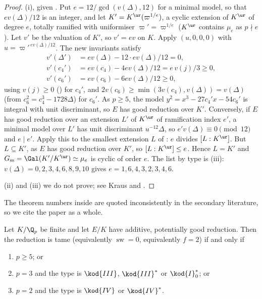 \begin{proof}
(i), given . Put $e=12/\gcd(v(\Delta),12)$ for a minimal model, so that $ev(\Delta)/12$ is an
integer, and let $K'=K^{\ur}(\varpi^{1/e})$, a cyclic extension of $K^{\ur}$ of degree $e$, totally ramified with uniformiser
$\varpi'=\varpi^{1/e}$ ($K^{\ur}$ contains $\mu_e$ as $p\nmid e$). Let $v'$ be the valuation of $K'$, so $v'=ev$ on $K$. Apply
$(u,0,0,0)$ with $u=\varpi'^{\,ev(\Delta)/12}$. The new invariants satisfy
\begin{align*}
v'(\Delta')&=ev(\Delta)-12\cdot ev(\Delta)/12=0,\\
v'(c_4')&=ev(c_4)-4ev(\Delta)/12=e\,v(j)/3\ge0,\\
v'(c_6')&=ev(c_6)-6ev(\Delta)/12\ge0,
\end{align*}
using $v(j)\ge0$ () for $c_4'$, and $2v(c_6)\ge\min(3v(c_4),v(\Delta))=v(\Delta)$ (from
$c_6^2=c_4^3-1728\Delta$) for $c_6'$. As $p\ge5$, the model $y^2=x^3-27c_4'x-54c_6'$ is integral with unit discriminant, so $E$
has good reduction over $K'$. Conversely, if $E$ has good reduction over an extension $L'$ of $K^{\ur}$ of ramification
index $e'$, a minimal model over $L'$ has unit discriminant $u^{-12}\Delta$, so $e'v(\Delta)\equiv0\pmod{12}$ and $e\mid e'$. Apply
this to the smallest extension $L$ of : $e$ divides $[L:K^{\ur}]$. But $L\subseteq K'$, as $E$
has good reduction over $K'$, so $[L:K^{\ur}]\le e$. Hence $L=K'$ and $G_{\mathrm{ss}}=\Gal(K'/K^{\ur})\simeq\mu_e$ is cyclic of
order $e$. The list by type is (iii): $v(\Delta)=0,2,3,4,6,8,9,10$ gives
$e=1,6,4,3,2,3,4,6$.

(ii) and (iii) we do not prove; see Kraus \cite{Kraus90} and \cite[Section 5.6]{Serre72}.
\end{proof}

The theorem numbers inside \cite{Kraus90} are quoted inconsistently in the secondary literature, so we cite the paper as a
whole.

\begin{theorem}\label{thm:reduction:tame-additive}
Let $K/\Q_p$ be finite and let $E/K$ have additive, potentially good reduction. Then the reduction is tame
(equivalently $\operatorname{sw}=0$, equivalently $f=2$) if and only if
\begin{enumerate}[label=(\alph*)]
\item $p\ge5$; or
\item $p=3$ and the type is $\kod{III}$, $\kod{III}^*$ or $\kod{I}_0^*$; or
\item $p=2$ and the type is $\kod{IV}$ or $\kod{IV}^*$.
\end{enumerate}
\end{theorem}

